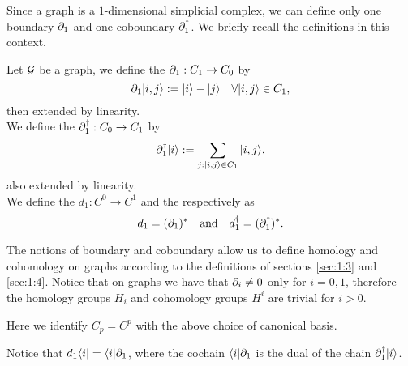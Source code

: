 \documentclass[../2.tex]{subfiles}
\begin{document}
    
    Since a graph is a $1$-dimensional simplicial complex, we can define only one boundary $\partial_1$ and one coboundary $\partial_1^\dagger$.
    We briefly recall the definitions in this context.

    \begin{defn}
        Let $\mathcal{G}$ be a graph, we define the  $\partial_1 : C_1 \to C_0$ by 
        \[ \partial_1| i,j \rangle := | i \rangle - | j \rangle \quad \forall | i,j \rangle \in C_1,\]
        then extended by linearity.\\
        We define the  $\partial^\dagger_1 : C_0 \to C_1$ by 
        \[ \partial^\dagger_1| i \rangle := \sum_{j : | i,j \rangle \in C_1} | i,j \rangle,\]
        also extended by linearity.\\
        We define the  $d_1 : C^0 \to C^1$ and the  respectively as
        \[ d_1 = (\partial_1)^* \quad \text{and} \quad d_1^\dagger = (\partial_1^\dagger)^* .\]
    \end{defn}

    The notions of boundary and coboundary allow us to define homology and cohomology on graphs according to the definitions of sections \ref{sec:1:3} and \ref{sec:1:4}.
    Notice that on graphs we have that $\partial_i \neq 0$ only for $i = 0,1$, therefore the homology groups $H_i$ and cohomology groups $H^i$ are trivial for $i > 0$.

    Here we identify $C_p = C^p$ with the above choice of
    canonical basis.

    Notice that $d_1\langle i | = \langle i |\partial_1$,
    where the cochain $\langle i |\partial_1$ is the dual of the chain $\partial_1^\dagger| i \rangle$.





\end{document}

